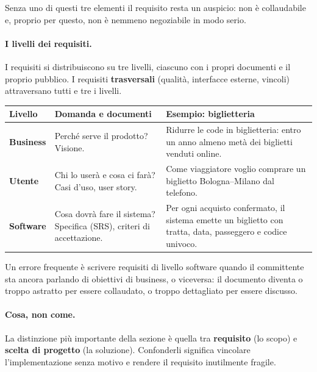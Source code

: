 \documentclass[12pt]{extarticle}
\begin{document}
\noindent Senza uno di questi tre elementi il requisito resta un auspicio: non è collaudabile e, proprio per questo, non è nemmeno negoziabile in modo serio.

\paragraph{I livelli dei requisiti.}
I requisiti si distribuiscono su tre livelli, ciascuno con i propri documenti e il proprio pubblico. I requisiti \textbf{trasversali} (qualità, interfacce esterne, vincoli) attraversano tutti e tre i livelli.

\begin{center}
\small
\begin{tabular}{p{2.0cm}p{5.2cm}p{8.0cm}}
    \toprule
    \textbf{Livello} & \textbf{Domanda e documenti} & \textbf{Esempio: biglietteria} \\
    \midrule
    \textbf{Business} & Perché serve il prodotto? Visione. & Ridurre le code in biglietteria: entro un anno almeno metà dei biglietti venduti online. \\
    \addlinespace
    \textbf{Utente} & Chi lo userà e cosa ci farà? Casi d'uso, user story. & Come viaggiatore voglio comprare un biglietto Bologna--Milano dal telefono. \\
    \addlinespace
    \textbf{Software} & Cosa dovrà fare il sistema? Specifica (SRS), criteri di accettazione. & Per ogni acquisto confermato, il sistema emette un biglietto con tratta, data, passeggero e codice univoco. \\
    \bottomrule
\end{tabular}
\end{center}

\noindent Un errore frequente è scrivere requisiti di livello software quando il committente sta ancora parlando di obiettivi di business, o viceversa: il documento diventa o troppo astratto per essere collaudato, o troppo dettagliato per essere discusso.

\paragraph{Cosa, non come.}
La distinzione più importante della sezione è quella tra \textbf{requisito} (lo scopo) e \textbf{scelta di progetto} (la soluzione). Confonderli significa vincolare l'implementazione senza motivo e rendere il requisito inutilmente fragile.
\end{document}
